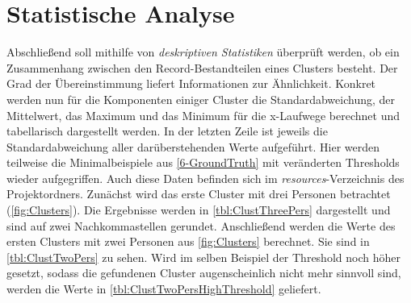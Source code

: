 \section{Statistische Analyse}
\label{6-Statistical}
Abschließend soll mithilfe von \emph{deskriptiven Statistiken} überprüft werden,
ob ein Zusammenhang zwischen den Record-Bestandteilen eines Clusters besteht.
Der Grad der Übereinstimmung liefert Informationen zur Ähnlichkeit.
Konkret werden nun für die Komponenten einiger Cluster
die Standardabweichung, der Mittelwert, das Maximum und das Minimum für die x-Laufwege berechnet
und tabellarisch dargestellt werden.
In der letzten Zeile ist jeweils die Standardabweichung aller darüberstehenden Werte aufgeführt.
Hier werden teilweise die Minimalbeispiele aus \autoref{6-GroundTruth} mit veränderten Thresholds wieder aufgegriffen.
Auch diese Daten befinden sich im \emph{resources}-Verzeichnis des Projektordners.
Zunächst wird das erste Cluster mit drei Personen betrachtet (\autoref{fig:Clusters}).
Die Ergebnisse werden in \autoref{tbl:ClustThreePers} dargestellt
und sind auf zwei Nachkommastellen gerundet.
Anschließend werden die Werte des ersten Clusters mit zwei Personen aus \autoref{fig:Clusters} berechnet.
Sie sind in \autoref{tbl:ClustTwoPers} zu sehen.
Wird im selben Beispiel der Threshold noch höher gesetzt,
sodass die gefundenen Cluster augenscheinlich nicht mehr sinnvoll sind,
werden die Werte in \autoref{tbl:ClustTwoPersHighThreshold} geliefert.
